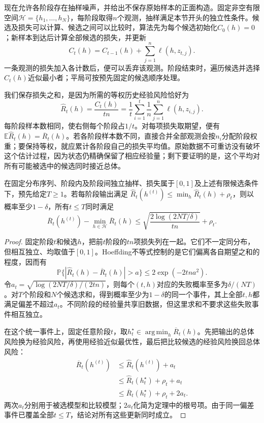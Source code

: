 现在允许各阶段存在抽样噪声，并给出不保存原始样本的正面构造。固定非空有限空间$\mathcal H=\{h_1,\ldots,h_N\}$，每阶段取得$n$个观测，抽样满足本节开头的独立性条件。候选及损失可以计算、候选之间可以比较时，算法先为每个候选初始化$C_0(h)=0$；新样本到达后计算全部候选的损失，并更新
\[
 C_t(h)=C_{t-1}(h)+\sum_{j=1}^n\ell(h,z_{t,j}).
\]
一条观测的损失加入各计数后，便可以丢弃该观测。阶段结束时，遍历候选并选择$C_t(h)$近似最小者；平局可按预先固定的候选顺序处理。

我们保存损失之和，是因为所需的等权历史经验风险恰好为
\[
 \widehat R_t(h)=\frac{C_t(h)}{tn}
 =\frac1t\sum_{i=1}^t\frac1n\sum_{j=1}^n\ell(h,z_{i,j}).
\]
每阶段样本数相同，使右侧每个阶段占$1/t$。对每项损失取期望，便有$\mathbb E\widehat R_t(h)=\overline R_t(h)$。若各阶段样本数不同，直接合并全部观测会按$n_i$分配阶段权重；要保持等权，就应累计各阶段自己的损失平均值。原始数据不可重访没有破坏这个估计过程，因为状态仍精确保留了相应经验量；剩下要证明的是，这个平均对所有可能被选中的候选同时接近总体。

\begin{theorem}[累计损失学习的历史平均保证]
\label{thm:continual-average-finite}
在固定分布序列、阶段内及阶段间独立抽样、损失属于$[0,1]$及上述有限候选条件下，预先给定$T\geq1$。若每阶段输出满足
$\widehat R_t(h^{(t)})\leq\min_h\widehat R_t(h)+\rho_t$，则以概率至少$1-\delta$，所有$t\leq T$同时满足
\begin{equation}
 \overline R_t(h^{(t)})-\min_{h\in\mathcal H}\overline R_t(h)
 \leq\sqrt{\frac{2\log(2NT/\delta)}{tn}}+\rho_t.
 \label{eq:continual-average-bound}
\end{equation}
\end{theorem}
\begin{proof}
固定阶段$t$和候选$h$，把前$t$阶段的$tn$项损失列在一起。它们不一定同分布，但相互独立、均取值于$[0,1]$。Hoeffding不等式控制的是它们偏离各自期望之和的程度，因而有
\[
 \mathbb P\{|\widehat R_t(h)-\overline R_t(h)|>a\}
 \leq2\exp(-2tn a^2).
\]
令$a_t=\sqrt{\log(2NT/\delta)/(2tn)}$，则每个$(t,h)$对应的失败概率至多为$\delta/(NT)$。对$T$个阶段和$N$个候选求和，得到概率至少为$1-\delta$的同一个事件，其上全部$t,h$都满足偏差不超过$a_t$。不同阶段的经验量共享旧数据，但这里求和不要求这些失败事件相互独立。

在这个统一事件上，固定任意阶段$t$，取$h_t^\star\in\operatorname*{arg\,min}_h\overline R_t(h)$。先把输出的总体风险换为经验风险，再使用经验近似最优性，最后把比较候选的经验风险换回总体风险：
\begin{align*}
 \overline R_t(h^{(t)})
 &\leq\widehat R_t(h^{(t)})+a_t\\
 &\leq\widehat R_t(h_t^\star)+\rho_t+a_t\\
 &\leq\overline R_t(h_t^\star)+\rho_t+2a_t.
\end{align*}
两次$a_t$分别用于被选模型和比较模型；$2a_t$化简为定理中的根号项。由于同一偏差事件已覆盖全部$t\leq T$，结论对所有这些更新同时成立。
\end{proof}


